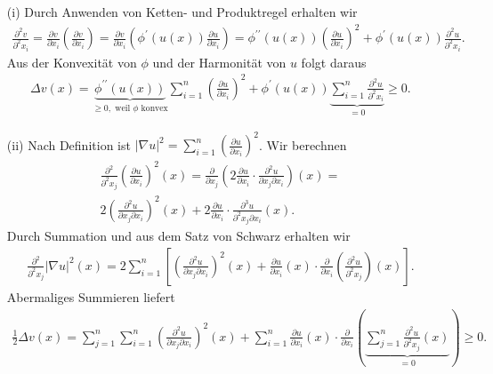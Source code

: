 \begin{solution}
  \begin{itemize}

  \item[(i)] Durch Anwenden von Ketten- und Produktregel erhalten wir
  \begin{align}
      \frac{\partial^2 v}{\partial^2 x_i} = \frac{\partial v}{\partial x_i} \left(\frac{\partial v}{\partial x_i}\right) = \frac{\partial v}{\partial x_i} \left(\phi^\prime(u(x)) \frac{\partial u}{\partial x_i}\right) = \phi^{\prime\prime}(u(x)) \left(\frac{\partial u}{\partial x_i}\right)^2 + \phi^\prime(u(x)) \frac{\partial^2 u}{\partial^2 x_i}.
  \end{align}
  Aus der Konvexität von $\phi$ und der Harmonität von $u$ folgt daraus
  \begin{align}
      \Delta v(x) = \underbrace{\phi^{\prime\prime}(u(x))}_{\geq 0, \text{~weil $\phi$ konvex}} \sum_{i=1}^n \left(\frac{\partial u}{\partial x_i}\right)^2 + \phi^\prime(u(x)) \underbrace{\sum_{i=1}^n \frac{\partial^2 u}{\partial^2 x_i}}_{= 0} \geq 0.
  \end{align}
  \item[(ii)] Nach Definition ist $|\nabla u|^2 = \sum_{i=1}^n \left(\frac{\partial u}{\partial x_i}\right)^2$. Wir berechnen
\begin{align}
    \frac{\partial^2}{\partial^2 x_j} \left(\frac{\partial u}{\partial x_i}\right)^2 (x) = \frac{\partial}{\partial x_j} \left(2 \frac{\partial u}{\partial x_i} \cdot \frac{\partial^2 u}{\partial x_j \partial x_i} \right)(x) = \\
    2 \left(\frac{\partial^2 u}{\partial x_j \partial x_i}\right)^2 (x) + 2\frac{\partial u}{\partial x_i} \cdot \frac{\partial^3 u}{\partial^2 x_j \partial x_i} (x).
\end{align}
Durch Summation und aus dem Satz von Schwarz erhalten wir
\begin{align}
    \frac{\partial^2}{\partial^2 x_j} |\nabla u|^2 (x) = 2 \sum_{i=1}^n \left[ \left(\frac{\partial^2 u}{\partial x_j \partial x_i} \right)^2(x) + \frac{\partial u}{\partial x_i}(x) \cdot \frac{\partial}{\partial x_i} \left(\frac{\partial^2 u}{\partial^2 x_j}\right)(x) \right].
\end{align}
Abermaliges Summieren liefert
\begin{align}
    \frac{1}{2} \Delta v (x) = \sum_{j=1}^n \sum_{i=1}^n \left(\frac{\partial^2 u}{\partial x_j \partial x_i} \right)^2(x) +
    \sum_{i=1}^n \frac{\partial u}{\partial x_i}(x) \cdot \frac{\partial}{\partial x_i} \left( \underbrace{\sum_{j=1}^n \frac{\partial^2 u}{\partial^2 x_j}(x)}_{= 0} \right) \geq 0.
\end{align}
  \end{itemize}

\end{solution}

